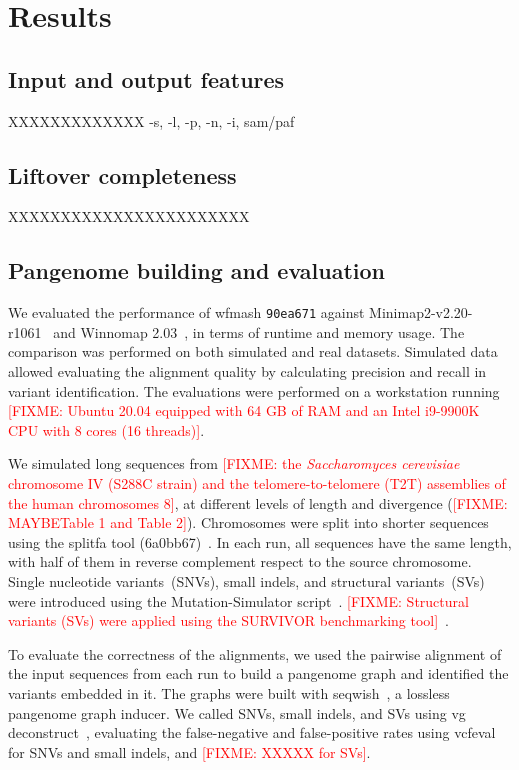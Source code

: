 \documentclass{bioinfo}
\theoremstyle{definition}
\newcommand{\red}[1]{{\textcolor{Red}{#1}}}
\newcommand{\FIXME}[1]{\red{[FIXME: #1]}}
\begin{document}
\section{Results}
\label{sec:results}

\subsection{Input and output features}
XXXXXXXXXXXXX -s, -l, -p, -n, -i, sam/paf

\subsection{Liftover completeness}
XXXXXXXXXXXXXXXXXXXXXXX

\subsection{Pangenome building and evaluation}
We evaluated the performance of wfmash \texttt{90ea671} against Minimap2-v2.20-r1061~\citep{Li_2018} and Winnomap 2.03~\citep{Jain_2020b}, in terms of runtime and memory usage.
The comparison was performed on both simulated and real datasets. Simulated data allowed evaluating the alignment quality by calculating precision and recall in variant identification.
The evaluations were performed on a workstation running \FIXME{Ubuntu 20.04 equipped with 64 GB of RAM and an Intel i9-9900K CPU with 8 cores (16 threads)}.

We simulated long sequences from \FIXME{the \textit{Saccharomyces cerevisiae} chromosome IV (S288C strain) and the telomere-to-telomere (T2T) assemblies of the human chromosomes 8}, at different levels of length and divergence (\FIXME{MAYBETable 1 and Table 2}).
Chromosomes were split into shorter sequences using the splitfa tool (6a0bb67)~\citep{splitfa-gh}.
In each run, all sequences have the same length, with half of them in reverse complement respect to the source chromosome.
Single nucleotide variants~(SNVs), small indels, and structural variants~(SVs) were introduced using the Mutation-Simulator script~\citep{Khl2020}.
\FIXME{Structural variants (SVs) were applied using the SURVIVOR benchmarking tool}~\citep{Jeffares2017}.

To evaluate the correctness of the alignments, we used the pairwise alignment of the input sequences from each run to build a pangenome graph and identified the variants embedded in it.
The graphs were built with seqwish~\citep{Garrison2022}, a lossless pangenome graph inducer.
We called SNVs, small indels, and SVs using vg deconstruct~\citep{Garrison:2018}, evaluating the false-negative and false-positive rates using vcfeval~\citep{Cleary2015} for SNVs and small indels, and \FIXME{XXXXX for SVs}.
\end{document}
